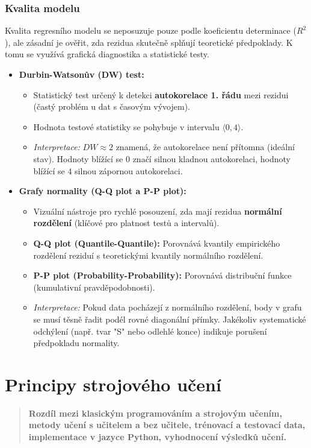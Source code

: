 \subsubsection*{Kvalita modelu}
Kvalita regresního modelu se neposuzuje pouze podle koeficientu determinace ($R^2$), ale zásadní je ověřit, zda rezidua skutečně splňují teoretické předpoklady. K tomu se využívá grafická diagnostika a statistické testy.

\begin{itemize}
    \item \textbf{Durbin-Watsonův (DW) test:}
    \begin{itemize}
        \item Statistický test určený k detekci \textbf{autokorelace 1. řádu} mezi rezidui (častý problém u dat s časovým vývojem).
        \item Hodnota testové statistiky se pohybuje v intervalu $\langle 0, 4 \rangle$.
        \item \textit{Interpretace:} $DW \approx 2$ znamená, že autokorelace není přítomna (ideální stav). Hodnoty blížící se $0$ značí silnou kladnou autokorelaci, hodnoty blížící se $4$ silnou zápornou autokorelaci.
    \end{itemize}

    \item \textbf{Grafy normality (Q-Q plot a P-P plot):}
    \begin{itemize}
        \item Vizuální nástroje pro rychlé posouzení, zda mají rezidua \textbf{normální rozdělení} (klíčové pro platnost testů a intervalů).
        \item \textbf{Q-Q plot (Quantile-Quantile):} Porovnává kvantily empirického rozdělení reziduí s teoretickými kvantily normálního rozdělení.
        \item \textbf{P-P plot (Probability-Probability):} Porovnává distribuční funkce (kumulativní pravděpodobnosti).
        \item \textit{Interpretace:} Pokud data pocházejí z normálního rozdělení, body v grafu se musí těsně řadit podél rovné diagonální přímky. Jakékoliv systematické odchýlení (např. tvar "S" nebo odlehlé konce) indikuje porušení předpokladu normality.
    \end{itemize}
\end{itemize}

\section{Principy strojového učení}
\begin{quote}
    \textbf{Rozdíl mezi klasickým programováním a strojovým učením, metody učení s učitelem a bez učitele, trénovací a testovací data, implementace v jazyce Python, vyhodnocení výsledků učení.}
\end{quote}

